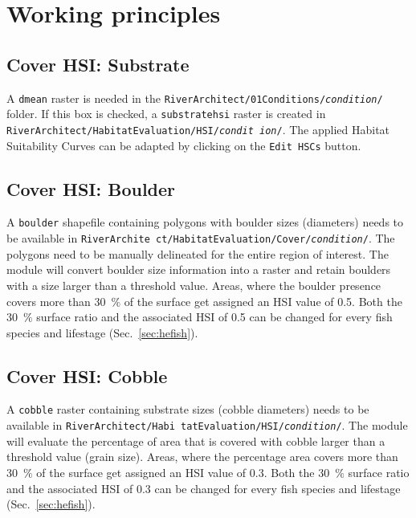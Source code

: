 \section{Working principles}\label{sec:heprin}

\subsection{Cover HSI: Substrate}\label{sec:subshsi}
A \texttt{dmean} raster is needed in the \texttt{RiverArchitect/01{\myUnderscore}Conditions/\textit{condition}/} folder. If this box is checked, a \texttt{substrate{\myUnderscore}hsi} raster is created in \texttt{RiverArchitect/HabitatEvaluation/HSI/\textit{condit ion}/}. The applied Habitat Suitability Curves can be adapted by clicking on the \texttt{Edit HSCs} button.

\subsection{Cover HSI: Boulder}\label{sec:bouhsi}
A \texttt{boulder} shapefile containing polygons with boulder sizes (diameters) needs to be available in \texttt{RiverArchite ct/HabitatEvaluation/Cover/\textit{condition}/}. The polygons need to be manually delineated for the entire region of interest. The module will convert boulder size information into a raster and retain boulders with a size larger than a threshold value. Areas, where the boulder presence covers more than 30~$\%$ of the surface get assigned an HSI value of 0.5. Both the 30~$\%$ surface ratio and the associated HSI of 0.5 can be changed for every fish species and lifestage (Sec.~\ref{sec:hefish}).

\subsection{Cover HSI: Cobble}\label{sec:cobhsi}
A \texttt{cobble} raster containing substrate sizes (cobble diameters) needs to be available in \texttt{RiverArchitect/Habi tatEvaluation/HSI/\textit{condition}/}. The module will evaluate the percentage of area that is covered with cobble larger than a threshold value (grain size). Areas, where the percentage area covers more than 30~$\%$ of the surface get assigned an HSI value of 0.3. Both the 30~$\%$ surface ratio and the associated HSI of 0.3 can be changed for every fish species and lifestage (Sec.~\ref{sec:hefish}).

